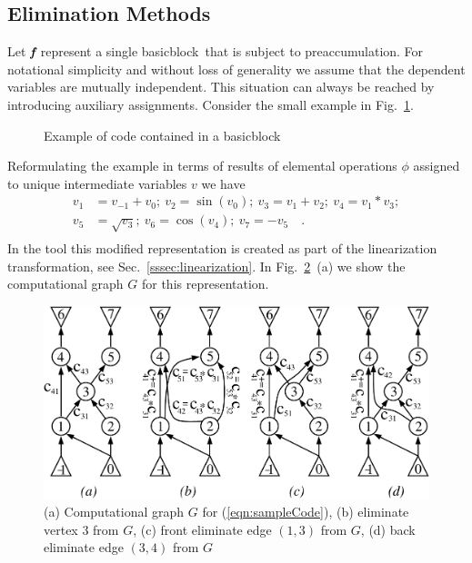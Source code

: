 \documentclass[11pt]{article}
\newcommand{\basicblock}{basicblock}
\newcommand{\bmf}{\mbox{\bf\em f}}
\newcommand{\refsec}[1]{{Sec.~\ref{#1}}}
\newcommand{\reffig}[1]{{Fig.~\ref{#1}}}
\newcommand{\refeqn}[1]{{(\ref{#1})}}
\begin{document}
\subsection{Elimination Methods} \label{ssec:elimMeth}
Let $\bmf$ represent a single \basicblock\ that is subject to preaccumulation.
For notational simplicity and without loss of generality we assume that the 
dependent variables are mutually independent. 
This situation can always be
reached by introducing auxiliary assignments.
Consider the small example in \reffig{fig:toyBB}.
\begin{figure}[h]
\begin{center}
\begin{minipage}{.4\textwidth}
\end{minipage}
\end{center}
\caption{Example of code contained in a \basicblock}\label{fig:toyBB}
\end{figure}
Reformulating the example in terms of 
results of elemental operations $\phi$ assigned to unique intermediate 
variables $v$ we have 
\begin{equation}\label{eqn:sampleCode}
\begin{split}
v_1&=v_{-1}+v_0;~v_2=\sin(v_0);~v_3=v_1+v_2;~v_4=v_1*v_3; \\
v_5&=\sqrt{v_3};~v_6=\cos(v_4);~v_7=-v_5 \quad .\\
\end{split}
\end{equation}
In the tool this modified representation is created as part of the linearization transformation, see 
\refsec{sssec:linearization}.
In \reffig{fig:elims}~(a) we show the computational graph $G$ for this representation.
\begin{figure}
\centering\includegraphics[width=.7\textwidth]{elims}
\caption{
(a) Computational graph $G$ for \refeqn{eqn:sampleCode}, 
(b) eliminate vertex 3 from $G$, 
(c) front eliminate edge $(1,3)$ from $G$, 
(d) back eliminate edge $(3,4)$ from $G$} 
\label{fig:elims}
\end{figure}
\end{document}
